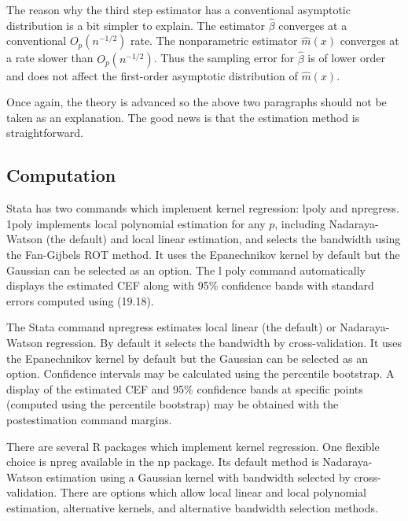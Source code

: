 \documentclass[10pt]{article}
\begin{document}
The reason why the third step estimator has a conventional asymptotic distribution is a bit simpler to explain. The estimator $\widehat{\beta}$ converges at a conventional $O_{p}\left(n^{-1 / 2}\right)$ rate. The nonparametric estimator $\widehat{m}(x)$ converges at a rate slower than $O_{p}\left(n^{-1 / 2}\right)$. Thus the sampling error for $\widehat{\beta}$ is of lower order and does not affect the first-order asymptotic distribution of $\widehat{m}(x)$.

Once again, the theory is advanced so the above two paragraphs should not be taken as an explanation. The good news is that the estimation method is straightforward.

\subsection{Computation}
Stata has two commands which implement kernel regression: lpoly and npregress. 1poly implements local polynomial estimation for any $p$, including Nadaraya-Watson (the default) and local linear estimation, and selects the bandwidth using the Fan-Gijbels ROT method. It uses the Epanechnikov kernel by default but the Gaussian can be selected as an option. The l poly command automatically displays the estimated CEF along with 95\% confidence bands with standard errors computed using (19.18).

The Stata command npregress estimates local linear (the default) or Nadaraya-Watson regression. By default it selects the bandwidth by cross-validation. It uses the Epanechnikov kernel by default but the Gaussian can be selected as an option. Confidence intervals may be calculated using the percentile bootstrap. A display of the estimated CEF and 95\% confidence bands at specific points (computed using the percentile bootstrap) may be obtained with the postestimation command margins.

There are several R packages which implement kernel regression. One flexible choice is npreg available in the np package. Its default method is Nadaraya-Watson estimation using a Gaussian kernel with bandwidth selected by cross-validation. There are options which allow local linear and local polynomial estimation, alternative kernels, and alternative bandwidth selection methods.
\end{document}
